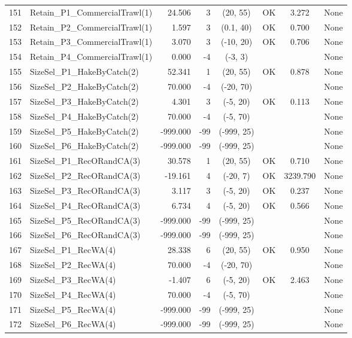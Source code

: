 \documentclass[12pt,]{article}
\begin{document}
\begin{landscape}
\begin{longtable}{rlrrcccl}
  151 & Retain\_P1\_CommercialTrawl(1) & 24.506 & 3 & (20, 55) & OK & 3.272 & None \\ 
  152 & Retain\_P2\_CommercialTrawl(1) & 1.597 & 3 & (0.1, 40) & OK & 0.700 & None \\ 
  153 & Retain\_P3\_CommercialTrawl(1) & 3.070 & 3 & (-10, 20) & OK & 0.706 & None \\ 
  154 & Retain\_P4\_CommercialTrawl(1) & 0.000 & -4 & (-3, 3) &  &  & None \\ 
  155 & SizeSel\_P1\_HakeByCatch(2) & 52.341 & 1 & (20, 55) & OK & 0.878 & None \\ 
  156 & SizeSel\_P2\_HakeByCatch(2) & 70.000 & -4 & (-20, 70) &  &  & None \\ 
  157 & SizeSel\_P3\_HakeByCatch(2) & 4.301 & 3 & (-5, 20) & OK & 0.113 & None \\ 
  158 & SizeSel\_P4\_HakeByCatch(2) & 70.000 & -4 & (-5, 70) &  &  & None \\ 
  159 & SizeSel\_P5\_HakeByCatch(2) & -999.000 & -99 & (-999, 25) &  &  & None \\ 
  160 & SizeSel\_P6\_HakeByCatch(2) & -999.000 & -99 & (-999, 25) &  &  & None \\ 
  161 & SizeSel\_P1\_RecORandCA(3) & 30.578 & 1 & (20, 55) & OK & 0.710 & None \\ 
  162 & SizeSel\_P2\_RecORandCA(3) & -19.161 & 4 & (-20, 7) & OK & 3239.790 & None \\ 
  163 & SizeSel\_P3\_RecORandCA(3) & 3.117 & 3 & (-5, 20) & OK & 0.237 & None \\ 
  164 & SizeSel\_P4\_RecORandCA(3) & 6.734 & 4 & (-5, 20) & OK & 0.566 & None \\ 
  165 & SizeSel\_P5\_RecORandCA(3) & -999.000 & -99 & (-999, 25) &  &  & None \\ 
  166 & SizeSel\_P6\_RecORandCA(3) & -999.000 & -99 & (-999, 25) &  &  & None \\ 
  167 & SizeSel\_P1\_RecWA(4) & 28.338 & 6 & (20, 55) & OK & 0.950 & None \\ 
  168 & SizeSel\_P2\_RecWA(4) & 70.000 & -4 & (-20, 70) &  &  & None \\ 
  169 & SizeSel\_P3\_RecWA(4) & -1.407 & 6 & (-5, 20) & OK & 2.463 & None \\ 
  170 & SizeSel\_P4\_RecWA(4) & 70.000 & -4 & (-5, 70) &  &  & None \\ 
  171 & SizeSel\_P5\_RecWA(4) & -999.000 & -99 & (-999, 25) &  &  & None \\ 
  172 & SizeSel\_P6\_RecWA(4) & -999.000 & -99 & (-999, 25) &  &  & None \\ 

\end{longtable}
\end{landscape}
\end{document}
